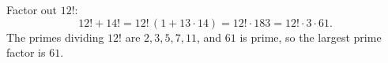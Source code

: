 Factor out $12!$:
\[
12!+14!=12!\,(1+13\cdot14)=12!\cdot183=12!\cdot3\cdot61 .
\]
The primes dividing $12!$ are $2,3,5,7,11$, and $61$ is prime, so the largest prime factor is $\boxed{61}$.
